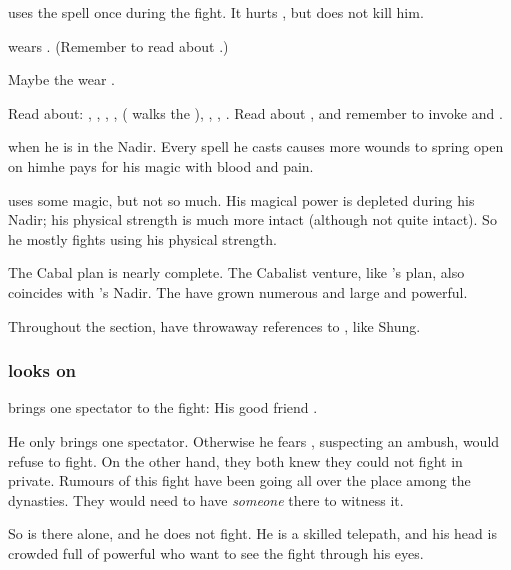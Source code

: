 \Ishnaruchaefir{} uses the spell  once during the fight. 
It hurts \Teshrial, but does not kill him. 

\Ishnaruchaefir{} wears . 
(Remember to read about .)

Maybe the \resphain wear .

Read about: 
  ,
  ,
  ,
  ,
   (\Teshrial{} walks the ),
  ,
  ,
  . 
Read about , and remember to invoke \Sethicus and \Tiamat. 

\Ishnaruchaefir {} when he is in the Nadir. 
Every spell he casts causes more wounds to spring open on him\dash{}he pays for his magic with blood and pain.

\Ishnaruchaefir uses some magic, but not so much. 
His magical power is depleted during his Nadir; his physical strength is much more intact (although not quite intact). 
So he mostly fights using his physical strength. 

The Cabal plan is nearly complete. 
The Cabalist \Malcur venture, like \Secherdamon's plan, also coincides with \Ishnaruchaefir's Nadir. 
The \noggyaleth have grown numerous and large and powerful.

Throughout the section, have throwaway references to , like Shung. 




\subsubsection{\Menessiaraid looks on}
\Teshrial{} brings one spectator to the fight: 
His good friend \Menessiaraid. 

He only brings one spectator. 
Otherwise he fears \Ishnaruchaefir, suspecting an ambush, would refuse to fight. 
On the other hand, they both knew they could not fight in private. 
Rumours of this fight have been going all over the place among the dynasties. 
They would need to have \emph{someone} there to witness it. 

So \Menessiaraid{} is there alone, and he does not fight. 
He is a skilled telepath, and his head is crowded full of powerful \resphain{} who want to see the fight through his eyes. 

